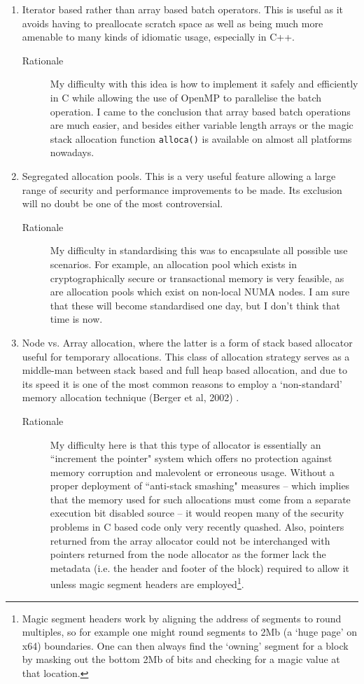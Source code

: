 \documentclass[wd]{isov2}
\begin{document}
{\begin{introduction}
\begin{enumerate}
\item Iterator based rather than array based batch operators. This is useful as it avoids having to preallocate scratch space as well as being much more amenable to many kinds of idiomatic usage, especially in C++.
\begin{description}
\item[Rationale] My difficulty with this idea is how to implement it safely and efficiently in C while allowing the use of OpenMP to parallelise the batch operation. I came to the conclusion that array based batch operations are much easier, and besides either variable length arrays or the magic stack allocation function \texttt{alloca()} is available on almost all platforms nowadays.
\end{description}
\item Segregated allocation pools. This is a very useful feature allowing a large range of security and performance improvements to be made. Its exclusion will no doubt be one of the most controversial.
\begin{description}
\item[Rationale] My difficulty in standardising this was to encapsulate all possible use scenarios. For example, an allocation pool which exists in cryptographically secure or transactional memory is very feasible, as are allocation pools which exist on non-local NUMA nodes. I am sure that these will become standardised one day, but I don't think that time is now.
\end{description}
\item Node vs. Array allocation, where the latter is a form of stack based allocator useful for temporary allocations. This class of allocation strategy serves as a middle-man between stack based and full heap based allocation, and due to its speed it is one of the most common reasons to employ a `non-standard' memory allocation technique (Berger et al, 2002) .
\begin{description}
\item[Rationale] My difficulty here is that this type of allocator is essentially an ``increment the pointer" system which offers no protection against memory corruption and malevolent or erroneous usage. Without a proper deployment of ``anti-stack smashing" measures -- which implies that the memory used for such allocations must come from a separate execution bit disabled source -- it would reopen many of the security problems in C based code only very recently quashed. Also, pointers returned from the array allocator could not be interchanged with pointers returned from the node allocator as the former lack the metadata (i.e. the header and footer of the block) required to allow it unless magic segment headers are employed\footnote{Magic segment headers work by aligning the address of segments to round multiples, so for example one might round segments to 2Mb (a `huge page' on x64) boundaries. One can then always find the `owning' segment for a block by masking out the bottom 2Mb of bits and checking for a magic value at that location.}.

\end{description}
\end{enumerate}
\end{introduction}}
\end{document}
